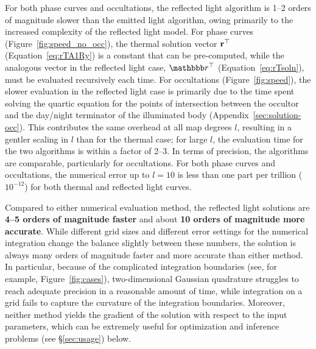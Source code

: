 \documentclass[modern]{aastex62}
\begin{document}
For both phase curves and occultations, the \starry reflected
light algorithm is 1--2 orders of
magnitude slower than the emitted light algorithm, owing
primarily to the increased complexity of the reflected light model.
For phase curves (Figure~\ref{fig:speed_no_occ}),
the thermal solution vector $\mathbf{r}^\top$ (Equation~\ref{eq:rTA1Ry}) is a constant
that can be pre-computed, while the analogous vector in the reflected
light case, $\rT$ (Equation~\ref{eq:rTsoln}), must be evaluated
recursively each time. For occultations (Figure~\ref{fig:speed}),
the slower evaluation in the reflected light case is primarily due to
the time spent solving the quartic equation for the points of intersection
between the occultor and the day/night terminator of the illuminated
body (Appendix~\ref{sec:solution-occ}). This contributes the
same overhead at all map degrees $l$, resulting in a gentler scaling
in $l$ than for the thermal case; for large $l$, the evaluation time
for the two algorithms is within a factor of 2--3.
%
In terms of precision, the algorithms are comparable, particularly
for occultations. For both phase curves and occultations, the numerical error up
to $l=10$ is less than one part per trillion ($10^{-12}$) for both thermal
and reflected light curves.

Compared to either numerical evaluation method, the \starry reflected light
solutions are
\textbf{4--5 orders of magnitude faster} and about
\textbf{10 orders of magnitude more accurate}. While different
grid sizes and different error settings for the numerical integration change
the balance slightly between these numbers, the \starry solution is always
many orders of magnitude faster and more accurate than either method.
In particular, because of the complicated integration boundaries
(see, for example, Figure~\ref{fig:cases}), two-dimensional Gaussian quadrature
struggles to reach adequate precision in a reasonable amount of time,
while integration on a grid fails to capture the curvature of the
integration boundaries. Moreover, neither method yields the gradient of the
solution with respect to the input parameters, which can be extremely useful
for optimization and inference problems (see \S\ref{sec:usage}) below.
\end{document}
